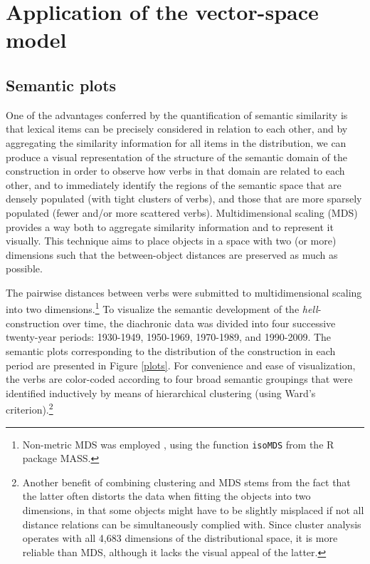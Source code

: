 \documentclass[11pt]{article}
\begin{document}
\section{Application of the vector-space model}

\subsection{Semantic plots}

One of the advantages conferred by the quantification of semantic similarity is that lexical items can be precisely considered in relation to each other, and by aggregating the similarity information for all items in the distribution, we can produce a visual representation of the structure of the semantic domain of the construction in order to observe how verbs in that domain are related to each other, and to immediately identify the regions of the semantic space that are densely populated (with tight clusters of verbs), and those that are more sparsely populated (fewer and/or more scattered verbs). Multidimensional scaling (MDS) provides a way both to aggregate similarity information and to represent it visually. This technique aims to place objects in a space with two (or more) dimensions such that the between-object distances are preserved as much as possible.

The pairwise distances between verbs were submitted to multidimensional scaling into two dimensions.\footnote{Non-metric MDS was employed \cite{Kruskal1964}, using the function \texttt{isoMDS} from the R package MASS.} To visualize the semantic development of the \textit{hell}-construction over time, the diachronic data was divided into four successive twenty-year periods: 1930-1949, 1950-1969, 1970-1989, and 1990-2009. The semantic plots corresponding to the distribution of the construction in each period are presented in Figure \ref{plots}. For convenience and ease of visualization, the verbs are color-coded according to four broad semantic groupings that were identified inductively by means of hierarchical clustering (using Ward's criterion).\footnote{Another benefit of combining clustering and MDS stems from the fact that the latter often distorts the data when fitting the objects into two dimensions, in that some objects might have to be slightly misplaced if not all distance relations can be simultaneously complied with. Since cluster analysis operates with all 4,683 dimensions of the distributional space, it is more reliable than MDS, although it lacks the visual appeal of the latter.}
\end{document}

